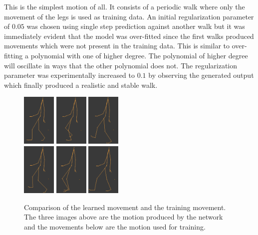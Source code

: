 \documentclass[letterpaper,9pt]{article}
\begin{document}
This is the simplest motion of all. It consists of a periodic walk where only the movement of the legs is used as training data. An initial regularization parameter of $0.05$ was chosen using single step prediction against another walk but it was immediately evident that the model was over-fitted since the first walks produced movements which were not present in the training data. This is similar to over-fitting a polynomial with one of higher degree. The polynomial of higher degree will oscillate in ways that the other polynomial does not. The regularization parameter was experimentally increased to $0.1$ by observing the generated output which finally produced a realistic and stable walk.\pagebreak

\begin{figure}[h!]
  \centering
  \includegraphics[width=60px]{Extra/out_simple_walk_1.png}
  \includegraphics[width=60px]{Extra/out_simple_walk_2.png}
  \includegraphics[width=60px]{Extra/out_simple_walk_3.png}\\
  \includegraphics[width=60px]{Extra/teach_simple_walk_1.png}
  \includegraphics[width=60px]{Extra/teach_simple_walk_2.png}
  \includegraphics[width=60px]{Extra/teach_simple_walk_3.png}
    \caption[Simple Walk]{Comparison of the learned movement and the training movement. The three images above are the motion produced by the network and the movements below are the motion used for training.}
\end{figure}
\end{document}

